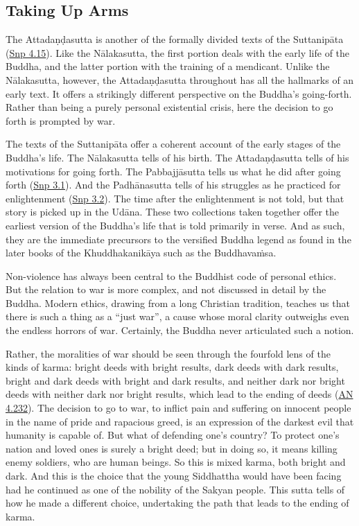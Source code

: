\documentclass[12pt,openany]{book}%
\begin{document}
\subsection*{Taking Up Arms}

The \textsanskrit{Attadaṇḍasutta} is another of the formally divided texts of the \textsanskrit{Suttanipāta} (\href{https://suttacentral.net/snp4.15/en/sujato}{Snp 4.15}). Like the \textsanskrit{Nālakasutta}, the first portion deals with the early life of the Buddha, and the latter portion with the training of a mendicant. Unlike the \textsanskrit{Nālakasutta}, however, the \textsanskrit{Attadaṇḍasutta} throughout has all the hallmarks of an early text. It offers a strikingly different perspective on the Buddha’s going-forth. Rather than being a purely personal existential crisis, here the decision to go forth is prompted by war.

The texts of the \textsanskrit{Suttanipāta} offer a coherent account of the early stages of the Buddha’s life. The \textsanskrit{Nālakasutta} tells of his birth. The \textsanskrit{Attadaṇḍasutta} tells of his motivations for going forth. The \textsanskrit{Pabbajjāsutta} tells us what he did after going forth (\href{https://suttacentral.net/snp3.1/en/sujato}{Snp 3.1}). And the \textsanskrit{Padhānasutta} tells of his struggles as he practiced for enlightenment (\href{https://suttacentral.net/snp3.2/en/sujato}{Snp 3.2}). The time after the enlightenment is not told, but that story is picked up in the \textsanskrit{Udāna}. These two collections taken together offer the earliest version of the Buddha’s life that is told primarily in verse. And as such, they are the immediate precursors to the versified Buddha legend as found in the later books of the \textsanskrit{Khuddhakanikāya} such as the \textsanskrit{Buddhavaṁsa}.

Non-violence has always been central to the Buddhist code of personal ethics. But the relation to war is more complex, and not discussed in detail by the Buddha. Modern ethics, drawing from a long Christian tradition, teaches us that there is such a thing as a “just war”, a cause whose moral clarity outweighs even the endless horrors of war. Certainly, the Buddha never articulated such a notion.

Rather, the moralities of war should be seen through the fourfold lens of the kinds of karma: bright deeds with bright results, dark deeds with dark results, bright and dark deeds with bright and dark results, and neither dark nor bright deeds with neither dark nor bright results, which lead to the ending of deeds (\href{https://suttacentral.net/an4.232/en/sujato}{AN 4.232}). The decision to go to war, to inflict pain and suffering on innocent people in the name of pride and rapacious greed, is an expression of the darkest evil that humanity is capable of. But what of defending one’s country? To protect one’s nation and loved ones is surely a bright deed; but in doing so, it means killing enemy soldiers, who are human beings. So this is mixed karma, both bright and dark. And this is the choice that the young Siddhattha would have been facing had he continued as one of the nobility of the Sakyan people. This sutta tells of how he made a different choice, undertaking the path that leads to the ending of karma.
\end{document}
